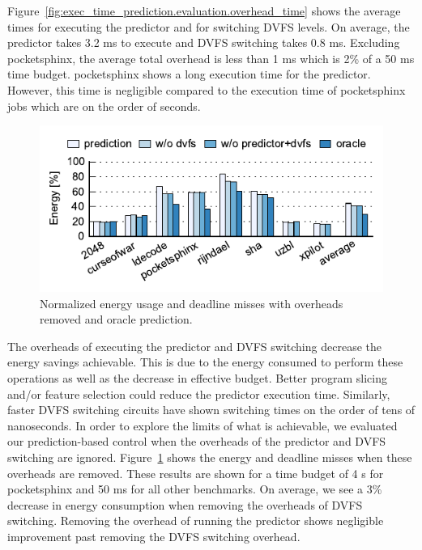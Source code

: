 Figure~\ref{fig:exec_time_prediction.evaluation.overhead_time} shows the
average times for executing the predictor and for switching DVFS levels.  On
average, the predictor takes 3.2 ms to execute and DVFS switching takes 0.8 ms.
Excluding pocketsphinx, the average total overhead is less than 1 ms which is
2\% of a 50 ms time budget.  pocketsphinx shows a long execution time for the
predictor. However, this time is negligible compared to the execution time of
pocketsphinx jobs which are on the order of seconds.

\begin{figure}
  \begin{center}
    \includegraphics{exec_time_prediction/data/overhead_comparison.pdf}
    \caption{Normalized energy usage and deadline misses with overheads removed
    and oracle prediction.}
    \label{fig:exec_time_prediction.evaluation.overhead_comparison}
  \end{center}
\end{figure}

The overheads of executing the predictor and DVFS switching decrease the energy
savings achievable. This is due to the energy consumed to perform these
operations as well as the decrease in effective budget.  Better program slicing
and/or feature selection could reduce the predictor execution time.  Similarly,
faster DVFS switching circuits \cite{booster-hpca12, shortstop-vlsic13,
fgsync-micro14} have shown switching times on the order of tens of nanoseconds.
In order to explore the limits of what is achievable, we evaluated our
prediction-based control when the overheads of the predictor and DVFS switching
are ignored.
Figure~\ref{fig:exec_time_prediction.evaluation.overhead_comparison} shows the
energy and deadline misses when these overheads are removed. These results are
shown for a time budget of 4 s for pocketsphinx and 50 ms for all other
benchmarks.  On average, we see a 3\% decrease in energy consumption when
removing the overheads of DVFS switching. Removing the overhead of running the
predictor shows negligible improvement past removing the DVFS switching
overhead.

